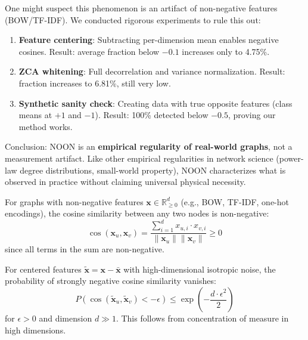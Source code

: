 \begin{remark}
\label{rem:noon_artifact}
One might suspect this phenomenon is an artifact of non-negative features (BOW/TF-IDF). We conducted rigorous experiments to rule this out:
\begin{enumerate}
    \item \textbf{Feature centering}: Subtracting per-dimension mean enables negative cosines. Result: average fraction below $-0.1$ increases only to 4.75\%.
    \item \textbf{ZCA whitening}: Full decorrelation and variance normalization. Result: fraction increases to 6.81\%, still very low.
    \item \textbf{Synthetic sanity check}: Creating data with true opposite features (class means at $+1$ and $-1$). Result: 100\% detected below $-0.5$, proving our method works.
\end{enumerate}
Conclusion: NOON is an \textbf{empirical regularity of real-world graphs}, not a measurement artifact. Like other empirical regularities in network science (power-law degree distributions, small-world property), NOON characterizes what is observed in practice without claiming universal physical necessity.
\end{remark}

\begin{theorem}
\label{thm:noon}
For graphs with non-negative features $\mathbf{x} \in \mathbb{R}^d_{\geq 0}$ (e.g., BOW, TF-IDF, one-hot encodings), the cosine similarity between any two nodes is non-negative:
\begin{equation}
    \cos(\mathbf{x}_u, \mathbf{x}_v) = \frac{\sum_{i=1}^d x_{u,i} \cdot x_{v,i}}{\|\mathbf{x}_u\| \|\mathbf{x}_v\|} \geq 0
\end{equation}
since all terms in the sum are non-negative.
\end{theorem}

\begin{proposition}
\label{prop:noon_centered}
For centered features $\tilde{\mathbf{x}} = \mathbf{x} - \bar{\mathbf{x}}$ with high-dimensional isotropic noise, the probability of strongly negative cosine similarity vanishes:
\begin{equation}
    P(\cos(\tilde{\mathbf{x}}_u, \tilde{\mathbf{x}}_v) < -\epsilon) \leq \exp\left(-\frac{d \cdot \epsilon^2}{2}\right)
\end{equation}
for $\epsilon > 0$ and dimension $d \gg 1$. This follows from concentration of measure in high dimensions.
\end{proposition}

